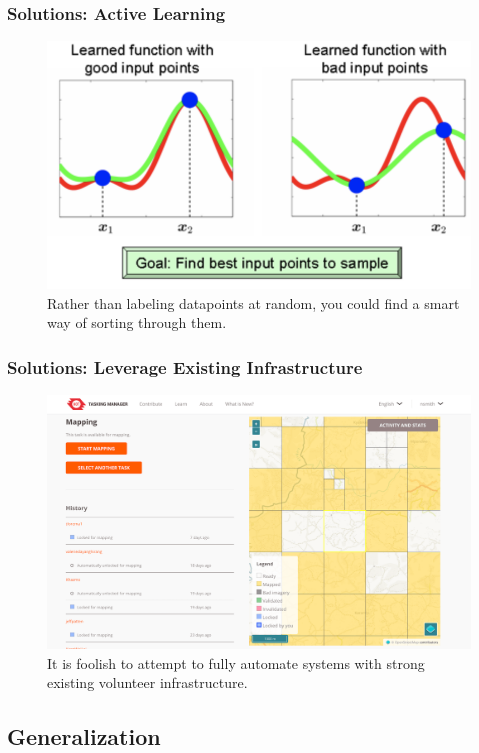 \documentclass[10pt,mathserif]{beamer}
\begin{document}
\begin{frame}
  \frametitle{Solutions: Active Learning}
  \begin{figure}[ht]
    \centering
    \includegraphics[options]{figures/active_learning}
    \caption{Rather than labeling datapoints at random, you could find a smart
      way of sorting through them. \label{fig:label} }
  \end{figure}
\end{frame}

\begin{frame}
  \frametitle{Solutions: Leverage Existing Infrastructure}
  \begin{figure}[ht]
    \centering
    \includegraphics[options]{figures/hotosm}
    \caption{It is foolish to attempt to fully automate systems with strong
      existing volunteer infrastructure. \label{fig:label} }
  \end{figure}
\end{frame}

\subsection{Generalization}
\label{subsec:label}
\end{document}
